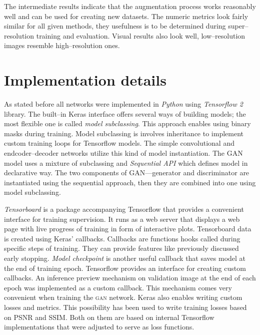 The intermediate results indicate that the augmentation process works reasonably well and can be used for creating new datasets.
The numeric metrics look fairly similar for all given methods, they usefulness is to be determined during super--resolution training and evaluation.
Visual results also look well, low--resolution images resemble high--resolution ones.

\section{Implementation details}
As stated before all networks were implemented in \textit{Python} using \textit{Tensorflow 2} library.
The built--in Keras interface offers several ways of building models; the most flexible one is called \textit{model subclassing}.
This approach enables using binary masks during training.
Model subclassing is involves inheritance to implement custom training loops for Tensorflow models.
The simple convolutional and endcoder--decoder networks utilize this kind of model instantiation.
The GAN model uses a mixture of subclassing and \textit{Sequential API} which defines model in declarative way.
The two components of GAN---generator and discriminator are instantiated using the sequential approach, then they are combined into one using model subclassing.

\textit{Tensorboard} is a package accompanying Tensorflow that provides a convenient interface for training supervision.
It runs as a web server that displays a web page with live progress of training in form of interactive plots.
Tensorboard data is created using Keras' callbacks.
Callbacks are functions hooks called during specific steps of training.
They can provide features like previously discussed early stopping.
\textit{Model checkpoint} is another useful callback that saves model at the end of training epoch.
Tensorflow provides an interface for creating custom callbacks.
An inference preview mechanism on validation image at the end of each epoch was implemented as a custom callback.
This mechanism comes very convenient when training the \textsc{gan} network.
Keras also enables writing custom losses and metrics.
This possibility has been used to write training losses based on PSNR and SSIM.
Both on them are based on internal Tensorflow implementations that were adjusted to serve as loss functions.
